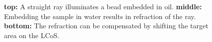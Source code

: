 \begin{figure}[!hbt]
  \centering
  \def\svgscale{.3}
  
  \caption{{\bf top:} A straight ray illuminates a bead embedded in
    oil. {\bf middle:} Embedding the sample in water results in
    refraction of the ray. {\bf bottom:} The refraction can be
    compensated by shifting the target area on the LCoS.}
  \label{fig:shift-correction}
\end{figure}
 
